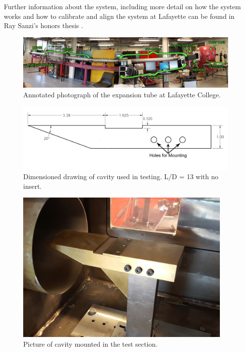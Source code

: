 Further information about the system, including more detail on how the system works and how to calibrate and align the system at Lafayette can be found in Ray Sanzi's honors thesis \cite{Sanzi2016}.



\newpage

\begin{figure}
\centering
\includegraphics[width=\textwidth]{Figures/TubeLabeled.jpg}
\caption[Annotated Expansion Tube]{Annotated photograph of the expansion tube at Lafayette College.}
\label{fig:tubelabeled}
\end{figure}

\begin{figure}
\centering
\includegraphics[width=\textwidth]{Figures/Cavitylabel.jpg}
\caption[Cavity Drawing]{Dimensioned drawing of cavity used in testing. L/D = 13 with no insert.}
\label{fig:cavModel}
\end{figure}

\begin{figure}
\centering
\includegraphics[height = 3in]{Figures/cavPhoto.jpg}
\caption[Cavity in Test Section]{Picture of cavity mounted in the test section.}
\label{fig:cavTestSection}
\end{figure}

